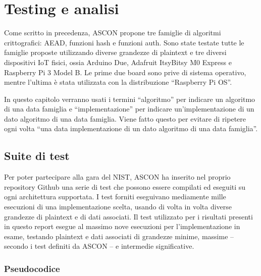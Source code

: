 \chapter{Testing e analisi}\label{ch:test_analysis}

Come scritto in precedenza, ASCON propone tre famiglie di algoritmi crittografici: AEAD, funzioni hash e funzioni auth. Sono state testate tutte le famiglie proposte utilizzando diverse grandezze di plaintext e tre diversi dispositivi IoT fisici, ossia Arduino Due, Adafruit ItsyBitsy M0 Express e Raspberry Pi 3 Model B. Le prime due board sono prive di sistema operativo, mentre l'ultima è stata utilizzata con la distribuzione ``Raspberry Pi OS''.

\noindent In questo capitolo verranno usati i termini ``algoritmo'' per indicare un algoritmo di una data famiglia e ``implementazione'' per indicare un'implementazione di un dato algoritmo di una data famiglia. Viene fatto questo per evitare di ripetere ogni volta ``una data implementazione di un dato algoritmo di una data famiglia''.

\section{Suite di test}

Per poter partecipare alla gara del NIST, ASCON ha inserito nel proprio repository Github una serie di test che possono essere compilati ed eseguiti su ogni architettura supportata. I test forniti eseguivano mediamente mille esecuzioni di una implementazione scelta, usando di volta in volta diverse grandezze di plaintext e di dati associati. Il test utilizzato per i risultati presenti in questo report esegue al massimo nove esecuzioni per l'implementazione in esame, testando plaintext e dati associati di grandezze minime, massime – secondo i test definiti da ASCON – e intermedie significative.

\subsection{Pseudocodice}

